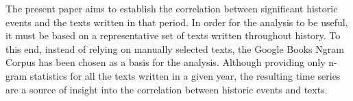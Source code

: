 The present paper aims to establish the correlation between significant historic events and the texts written in that period. In order for the analysis to be useful, it must be based on a representative set of texts written throughout history. To this end, instead of relying on manually selected texts, the Google Books Ngram Corpus has been chosen as a basis for the analysis. Although providing only n-gram statistics for all the texts written in a given year, the resulting time series are a source of insight into the correlation between historic events and texts.

